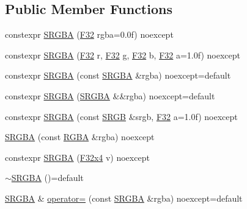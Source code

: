 \subsection*{Public Member Functions}
\begin{DoxyCompactItemize}
\item 
constexpr \mbox{\hyperlink{structmage_1_1_s_r_g_b_a_ab2d736d077534d550020b0f01e5780ae}{S\+R\+G\+BA}} (\mbox{\hyperlink{namespacemage_aa97e833b45f06d60a0a9c4fc22ae02c0}{F32}} rgba=0.\+0f) noexcept
\item 
constexpr \mbox{\hyperlink{structmage_1_1_s_r_g_b_a_a159096e69a7e18eee0d6718d244a1493}{S\+R\+G\+BA}} (\mbox{\hyperlink{namespacemage_aa97e833b45f06d60a0a9c4fc22ae02c0}{F32}} r, \mbox{\hyperlink{namespacemage_aa97e833b45f06d60a0a9c4fc22ae02c0}{F32}} g, \mbox{\hyperlink{namespacemage_aa97e833b45f06d60a0a9c4fc22ae02c0}{F32}} b, \mbox{\hyperlink{namespacemage_aa97e833b45f06d60a0a9c4fc22ae02c0}{F32}} a=1.\+0f) noexcept
\item 
constexpr \mbox{\hyperlink{structmage_1_1_s_r_g_b_a_a2f1125cfd0ba308a1f249e2b43637031}{S\+R\+G\+BA}} (const \mbox{\hyperlink{structmage_1_1_s_r_g_b_a}{S\+R\+G\+BA}} \&rgba) noexcept=default
\item 
constexpr \mbox{\hyperlink{structmage_1_1_s_r_g_b_a_abb441510c3afe709ddfb6f094f1ba2e5}{S\+R\+G\+BA}} (\mbox{\hyperlink{structmage_1_1_s_r_g_b_a}{S\+R\+G\+BA}} \&\&rgba) noexcept=default
\item 
constexpr \mbox{\hyperlink{structmage_1_1_s_r_g_b_a_a5ff3a33ee8ee285bec1735e8c796a766}{S\+R\+G\+BA}} (const \mbox{\hyperlink{structmage_1_1_s_r_g_b}{S\+R\+GB}} \&srgb, \mbox{\hyperlink{namespacemage_aa97e833b45f06d60a0a9c4fc22ae02c0}{F32}} a=1.\+0f) noexcept
\item 
\mbox{\hyperlink{structmage_1_1_s_r_g_b_a_a17b38cf5574d403a22e0bacbfc1c9416}{S\+R\+G\+BA}} (const \mbox{\hyperlink{structmage_1_1_r_g_b_a}{R\+G\+BA}} \&rgba) noexcept
\item 
constexpr \mbox{\hyperlink{structmage_1_1_s_r_g_b_a_a172912ff3393d3ffee54f63135cfee3c}{S\+R\+G\+BA}} (\mbox{\hyperlink{namespacemage_a851648f37dfb126a2d2f973e102861ad}{F32x4}} v) noexcept
\item 
\mbox{\hyperlink{structmage_1_1_s_r_g_b_a_a1a3df218eb9077b50380b831dbbfc753}{$\sim$\+S\+R\+G\+BA}} ()=default
\item 
\mbox{\hyperlink{structmage_1_1_s_r_g_b_a}{S\+R\+G\+BA}} \& \mbox{\hyperlink{structmage_1_1_s_r_g_b_a_ac21035a9eadad3c0d78364b17692e4fc}{operator=}} (const \mbox{\hyperlink{structmage_1_1_s_r_g_b_a}{S\+R\+G\+BA}} \&rgba) noexcept=default

\end{DoxyCompactItemize}
